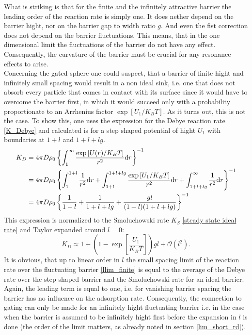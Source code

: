 What is striking is that for the finite and the infinitely attractive barrier the leading order of the reaction rate is simply one. It does nether depend on the barrier hight, nor on the barrier gap to width ratio $g$. And even the fist correction does not depend on the barrier fluctuations. This means, that in the one dimensional limit the fluctuations of the barrier do not have any effect. Consequently, the curvature of the barrier must be crucial for any resonance effects to arise.\\
Concerning the gated sphere one could suspect, that a barrier of finite hight and infinitely small spacing would result in a non ideal sink, i.e. one that does not absorb every particle that comes in contact with its surface since it would have to overcome the barrier first, in which it would succeed only with a probability proportionate to an Arrhenius factor $\exp\left[U_1/K_B T \right]$. As it turns out, this is not the case. To show this, one uses the expression for the Debye reaction rate \eqref{K_Debye} and calculated is for a step shaped potential of hight $U_1$ with boundaries at $1+l$ and $1+l+lg$.
\begin{align}
    K_D   &= 4 \pi D \rho_0 \left\{ \int_{1}^{\infty} \frac{\exp \left[U(r)/K_B T \right]}{r^2} {\rm d} r \right\}^{-1} \nonumber \\
    &=4 \pi D \rho_0 \left\{ \int_{1}^{1+l} \frac{1}{r^2}{\rm d}r + \int_{1+l}^{1+l+lg} \frac{\exp \left[U_1/K_B T \right]}{r^2} {\rm d} r + \int_{1+l+lg}^{\infty}\frac{1}{r^2}{\rm d}r \right\}^{-1} \nonumber \\
    &= 4 \pi D \rho_0 \left\{ \frac{1}{1+l} + \frac{1}{1+l+lg} + \frac{g l}{ (1+l)(1+l+lg)} \right\}^{-1}
    \label{Debye_llimit}
\end{align}
This expression is normalized to the Smoluchowski rate $K_S$ \eqref{steady state ideal rate} and Taylor expanded around $l=0$:
\begin{equation}
    K_D \approx 1+\left(1-\exp\left[\frac{U_1}{K_B T}\right] \right)gl + \mathcal{O}(l^2).
    \label{Debye_taylor}
\end{equation}
It is obvious, that up to linear order in $l$ the small spacing limit of the reaction rate over the fluctuating barrier \eqref{llim_finite} is equal to the average of the Debye rate over the step shaped barrier and the Smoluchowski rate for an ideal barrier. \\
Again, the leading term is equal to one, i.e. for vanishing barrier spacing the barrier has no influence on the adsorption rate. Consequently, the connection to gating can only be made for an infinitely hight fluctuating barrier i.e. in the case when the barrier is assumed to be infinitely hight first before the expansion in $l$ is done (the order of the limit matters, as already noted in section \ref{lim_short_rd}). \\
